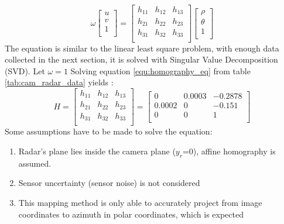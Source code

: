 \begin{equation}\label{equ:homography_eq}
    \omega
    \begin{bmatrix}
        u\\
        v\\
        1\\
        \end{bmatrix}=
    \begin{bmatrix}  
        h_{11} & h_{12} & h_{13}\\
        h_{21} & h_{22} & h_{23}\\
        h_{31} & h_{32} & h_{33}\\
    \end{bmatrix}  
    \begin{bmatrix}
    {\rho}\\
    {\theta}\\
    1\\
    \end{bmatrix}
\end{equation}
The equation is similar to the linear least square problem,
with enough data collected in the next section, it is solved with Singular Value Decomposition (SVD).
Let $\omega=1$ Solving equation \ref*{equ:homography_eq} from table \ref*{tab:cam_radar_data} yields :
\begin{equation}\label{equ:H_eq}
H = 
\begin{bmatrix}  
    h_{11} & h_{12} & h_{13}\\
    h_{21} & h_{22} & h_{23}\\
    h_{31} & h_{32} & h_{33}\\
\end{bmatrix}
=
\begin{bmatrix}  
    0 & 0.0003 & -0.2878\\
    0.0002 & 0 & -0.151\\
    0 & 0 & 1\\
\end{bmatrix}
\end{equation}
Some assumptions have to be made to solve the equation:
\vspace{-5mm}
\begin{enumerate}
    \item Radar's plane lies inside the camera plane ($y_r$=0), affine homography is assumed.
    \vspace{-5mm}
    \item Sensor uncertainty (sensor noise) is not considered
    \vspace{-5mm}
    \item This mapping method is only able to accurately project from image coordinates to azimuth in polar coordinates, 
            which is expected
\end{enumerate}

